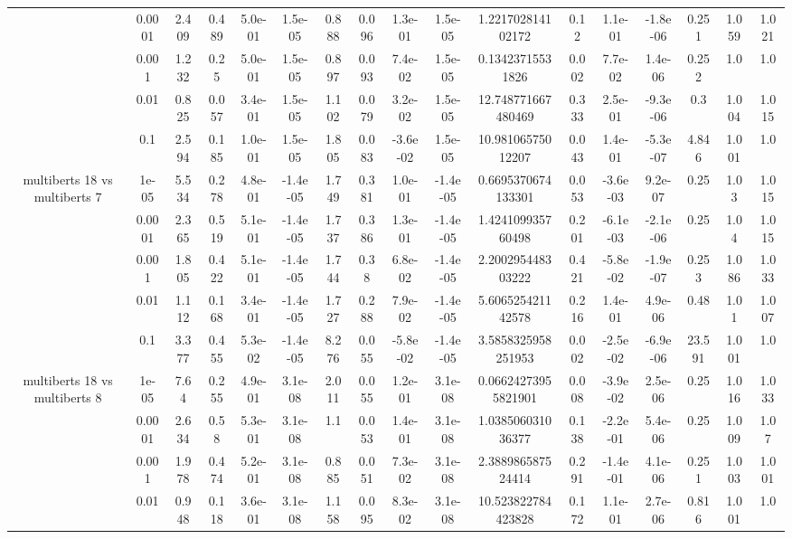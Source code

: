 \begin{tabular}{|c|c|c|c|c|c|c|c|c|c|c|c|c|c|c|c|c|}
 & 0.0001 & 2.409 & 0.489 & 5.0e-01 & 1.5e-05 & 0.888 & 0.096 & 1.3e-01 & 1.5e-05 & 1.221702814102172 & 0.12 & 1.1e-01 & -1.8e-06 & 0.251 & 1.059 & 1.021 \\
 & 0.001 & 1.232 & 0.25 & 5.0e-01 & 1.5e-05 & 0.897 & 0.093 & 7.4e-02 & 1.5e-05 & 0.13423715531826 & 0.002 & 7.7e-02 & 1.4e-06 & 0.252 & 1.0 & 1.0 \\
 & 0.01 & 0.825 & 0.057 & 3.4e-01 & 1.5e-05 & 1.102 & 0.079 & 3.2e-02 & 1.5e-05 & 12.748771667480469 & 0.333 & 2.5e-01 & -9.3e-06 & 0.3 & 1.004 & 1.015 \\
 & 0.1 & 2.594 & 0.185 & 1.0e-01 & 1.5e-05 & 1.805 & 0.083 & -3.6e-02 & 1.5e-05 & 10.98106575012207 & 0.043 & 1.4e-01 & -5.3e-07 & 4.846 & 1.001 & 1.0 \\
\hline
\multirow{5}{*}{multiberts 18 vs multiberts 7} & 1e-05 & 5.534 & 0.278 & 4.8e-01 & -1.4e-05 & 1.749 & 0.381 & 1.0e-01 & -1.4e-05 & 0.6695370674133301 & 0.053 & -3.6e-03 & 9.2e-07 & 0.25 & 1.03 & 1.015 \\
 & 0.0001 & 2.365 & 0.519 & 5.1e-01 & -1.4e-05 & 1.737 & 0.386 & 1.3e-01 & -1.4e-05 & 1.424109935760498 & 0.201 & -6.1e-03 & -2.1e-06 & 0.25 & 1.04 & 1.015 \\
 & 0.001 & 1.805 & 0.422 & 5.1e-01 & -1.4e-05 & 1.744 & 0.38 & 6.8e-02 & -1.4e-05 & 2.200295448303222 & 0.421 & -5.8e-02 & -1.9e-07 & 0.253 & 1.086 & 1.033 \\
 & 0.01 & 1.112 & 0.168 & 3.4e-01 & -1.4e-05 & 1.727 & 0.288 & 7.9e-02 & -1.4e-05 & 5.606525421142578 & 0.216 & 1.4e-01 & 4.9e-06 & 0.48 & 1.01 & 1.007 \\
 & 0.1 & 3.377 & 0.455 & 5.3e-02 & -1.4e-05 & 8.276 & 0.055 & -5.8e-02 & -1.4e-05 & 3.5858325958251953 & 0.002 & -2.5e-02 & -6.9e-06 & 23.591 & 1.001 & 1.0 \\
\hline
\multirow{5}{*}{multiberts 18 vs multiberts 8} & 1e-05 & 7.64 & 0.255 & 4.9e-01 & 3.1e-08 & 2.011 & 0.055 & 1.2e-01 & 3.1e-08 & 0.06624273955821901 & 0.008 & -3.9e-02 & 2.5e-06 & 0.25 & 1.016 & 1.033 \\
 & 0.0001 & 2.634 & 0.58 & 5.3e-01 & 3.1e-08 & 1.1 & 0.053 & 1.4e-01 & 3.1e-08 & 1.038506031036377 & 0.138 & -2.2e-01 & 5.4e-06 & 0.25 & 1.009 & 1.07 \\
 & 0.001 & 1.978 & 0.474 & 5.2e-01 & 3.1e-08 & 0.885 & 0.051 & 7.3e-02 & 3.1e-08 & 2.388986587524414 & 0.291 & -1.4e-01 & 4.1e-06 & 0.251 & 1.003 & 1.001 \\
 & 0.01 & 0.948 & 0.118 & 3.6e-01 & 3.1e-08 & 1.158 & 0.095 & 8.3e-02 & 3.1e-08 & 10.523822784423828 & 0.172 & 1.1e-01 & 2.7e-06 & 0.816 & 1.001 & 1.0 \\

\end{tabular}

